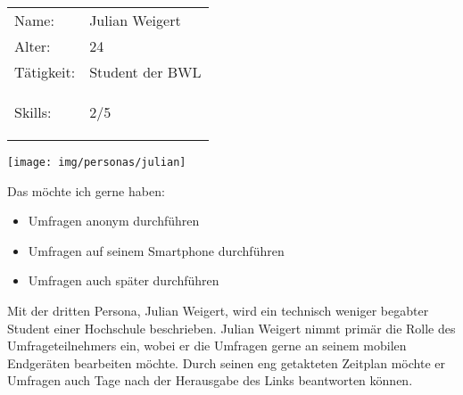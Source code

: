
\newcommand{\weigert}{Julian Weigert\xspace}
%
\newpage
\cvsect{\weigert} %
\begin{minipage}[t]{0.5\textwidth}
	\vspace{-3.6cm}
	\renewcommand{\arraystretch}{1.5}
	\begin{tabular}{l l}
		Name: & \weigert \\
		Alter: & 24 \\
		Tätigkeit: & Student der BWL \\
		Skills: & 2/5 \hspace{-1cm} \begin{barchart}{5.0}
			\baritemNL{}{2}
		\end{barchart} \\
	\end{tabular}
\end{minipage}
\hfill
\begin{minipage}[t]{0.4\textwidth}
	\flushright
	\texttt{[image: img/personas/julian]}
\end{minipage}
\autocite{rf-unsplash-student}

Das möchte ich gerne haben:
\begin{itemize}
	\item Umfragen anonym durchführen
    \item Umfragen auf seinem Smartphone durchführen
    \item Umfragen auch später durchführen
\end{itemize}

Mit der dritten Persona, \weigert, wird ein technisch weniger begabter Student einer Hochschule beschrieben.
\weigert nimmt primär die Rolle des Umfrageteilnehmers ein, wobei er die Umfragen gerne an seinem mobilen Endgeräten bearbeiten möchte.
Durch seinen eng getakteten Zeitplan möchte er Umfragen auch Tage nach der Herausgabe des Links beantworten können.
